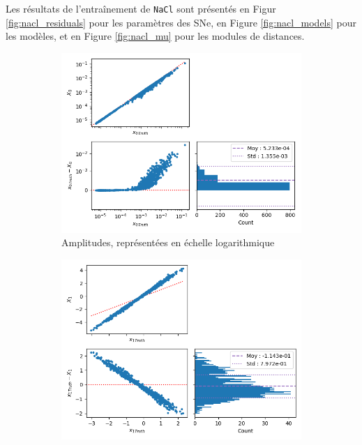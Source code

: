 \documentclass{book}
\def\nacl{\texttt{NaCl}\xspace}
\begin{document}
Les résultats de l'entraînement de \nacl sont présentés en Figur \ref{fig:nacl_residuals} pour les paramètres des SNe, en Figure \ref{fig:nacl_models} pour les modèles, et en Figure \ref{fig:nacl_mu} pour les modules de distances.

\begin{figure}
	\centering
	\begin{subfigure}{0.45\textwidth}
		\centering
		\includegraphics[width=\textwidth]{figures/nacl_x0.png}
		\caption{Amplitudes, représentées en échelle logarithmique}
		\label{fig:nacl_x0}
	\end{subfigure}
	\hfill
	\begin{subfigure}{0.45\textwidth}
		\centering
		\includegraphics[width=\textwidth]{figures/nacl_x1.png}

\end{subfigure}
\end{figure}
\end{document}
